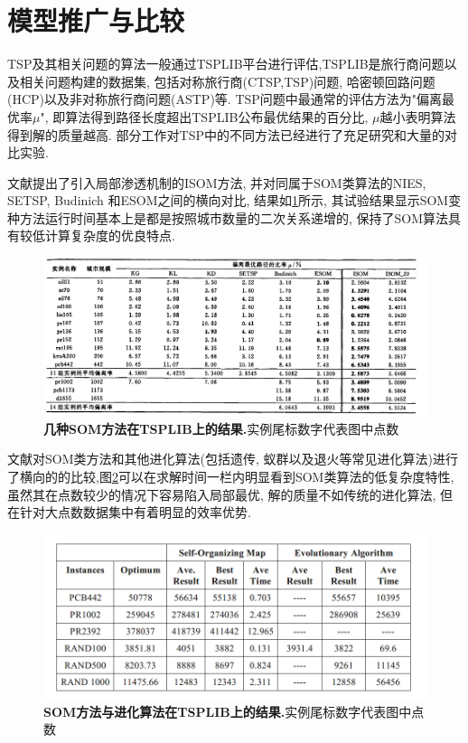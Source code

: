 \section{模型推广与比较}

TSP及其相关问题的算法一般通过TSPLIB平台进行评估,TSPLIB\cite{Reinelt1991TSPLIB}是旅行商问题以及相关问题构建的数据集, 包括对称旅行商(CTSP,TSP)问题, 哈密顿回路问题(HCP)以及非对称旅行商问题(ASTP)等. TSP问题中最通常的评估方法为"偏离最优率$\mu$", 即算法得到路径长度超出TSPLIB公布最优结果的百分比, $\mu$越小表明算法得到解的质量越高.
部分工作对TSP中的不同方法已经进行了充足研究和大量的对比实验. 

文献\cite{som-mtsp2}提出了引入局部渗透机制的ISOM方法, 并对同属于SOM类算法的NIES\cite{N2003A}, SETSP\cite{SETSP}, Budinich 和ESOM\cite{ESOM}之间的横向对比, 结果如\ref{fig:som-cp}所示, 其试验结果显示SOM变种方法运行时间基本上是都是按照城市数量的二次关系递增的, 保持了SOM算法具有较低计算复杂度的优良特点.
\begin{figure}[h]
    \begin{center}
        \includegraphics[width=0.85\linewidth]{fig/som-cp}
    \end{center}
    \caption{\textbf{几种SOM方法在TSPLIB上的结果.}实例尾标数字代表图中点数 }
        \label{fig:som-cp}
\end{figure}


文献\cite{2007Kohonen}对SOM类方法和其他进化算法(包括遗传, 蚁群以及退火等常见进化算法)进行了横向的的比较,图\ref{fig:som-cp2}可以在求解时间一栏内明显看到SOM类算法的低复杂度特性, 虽然其在点数较少的情况下容易陷入局部最优, 解的质量不如传统的进化算法, 但在针对大点数数据集中有着明显的效率优势.
\begin{figure}[h]
    \begin{center}
        \includegraphics[width=0.65\linewidth]{fig/som-cp2}
    \end{center}
    \caption{\textbf{SOM方法与进化算法在TSPLIB上的结果.}实例尾标数字代表图中点数 }
        \label{fig:som-cp2}
\end{figure}










